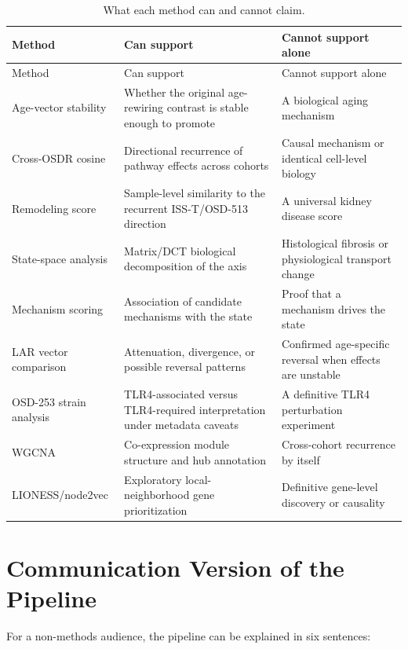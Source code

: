 \documentclass[11pt]{article}
\begin{document}
\begin{longtable}{p{}p{}p{}}
\caption{What each method can and cannot claim.}\\
\toprule
Method & Can support & Cannot support alone \\
\midrule
\endfirsthead
\toprule
Method & Can support & Cannot support alone \\
\midrule
\endhead
Age-vector stability & Whether the original age-rewiring contrast is stable enough to promote & A biological aging mechanism \\
Cross-OSDR cosine & Directional recurrence of pathway effects across cohorts & Causal mechanism or identical cell-level biology \\
Remodeling score & Sample-level similarity to the recurrent ISS-T/OSD-513 direction & A universal kidney disease score \\
State-space analysis & Matrix/DCT biological decomposition of the axis & Histological fibrosis or physiological transport change \\
Mechanism scoring & Association of candidate mechanisms with the state & Proof that a mechanism drives the state \\
LAR vector comparison & Attenuation, divergence, or possible reversal patterns & Confirmed age-specific reversal when effects are unstable \\
OSD-253 strain analysis & TLR4-associated versus TLR4-required interpretation under metadata caveats & A definitive TLR4 perturbation experiment \\
WGCNA & Co-expression module structure and hub annotation & Cross-cohort recurrence by itself \\
LIONESS/node2vec & Exploratory local-neighborhood gene prioritization & Definitive gene-level discovery or causality \\
\bottomrule
\end{longtable}

\section{Communication Version of the Pipeline}

For a non-methods audience, the pipeline can be explained in six sentences:
\end{document}
